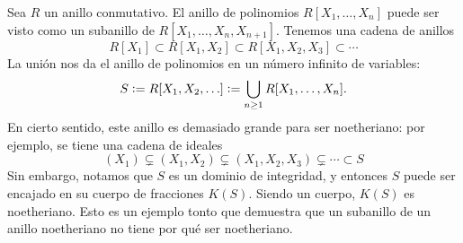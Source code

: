 \begin{ejemplo}
  Sea $R$ un anillo conmutativo. El anillo de polinomios $R [X_1,\ldots,X_n]$
  puede ser visto como un subanillo de $R [X_1,\ldots,X_n,X_{n+1}]$. Tenemos una
  cadena de anillos
  $$R [X_1] \subset R [X_1,X_2] \subset R [X_1,X_2,X_3] \subset \cdots$$
  La unión nos da el anillo de polinomios en un número infinito de variables:
  $$S \mathrel{\mathop:}= R [X_1,X_2,\ldots] \mathrel{\mathop:}= \bigcup_{n\ge 1} R [X_1,\ldots,X_n].$$
  En cierto sentido, este anillo es demasiado grande para ser noetheriano: por
  ejemplo, se tiene una cadena de ideales
  $$(X_1) \subsetneq (X_1,X_2) \subsetneq (X_1,X_2,X_3) \subsetneq \cdots \subset S$$
  Sin embargo, notamos que $S$ es un dominio de integridad, y entonces $S$ puede
  ser encajado en su cuerpo de fracciones $K (S)$. Siendo un cuerpo, $K (S)$ es
  noetheriano. Esto es un ejemplo tonto que demuestra que un subanillo de un
  anillo noetheriano no tiene por qué ser noetheriano.
\end{ejemplo}


